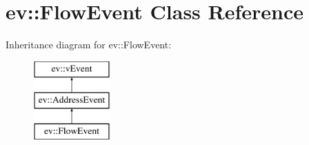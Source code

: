 \hypertarget{classev_1_1FlowEvent}{}\section{ev\+:\+:Flow\+Event Class Reference}
\label{classev_1_1FlowEvent}
Inheritance diagram for ev\+:\+:Flow\+Event\+:\begin{figure}[H]
\begin{center}
\leavevmode
\includegraphics[height=3.000000cm]{classev_1_1FlowEvent}
\end{center}
\end{figure}
